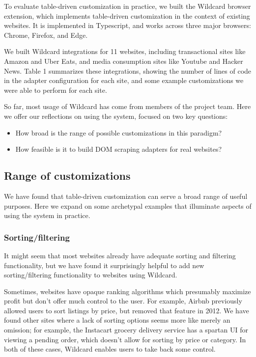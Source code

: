 \documentclass[sigplan,screen,10pt,anonymous,review]{acmart}
\providecommand{\tightlist}{%
  \setlength{\itemsep}{0pt}\setlength{\parskip}{0pt}}
\begin{document}
To evaluate table-driven customization in practice, we built the
Wildcard browser extension, which implements table-driven customization
in the context of existing websites. It is implemented in Typescript,
and works across three major browsers: Chrome, Firefox, and Edge.

We built Wildcard integrations for 11 websites, including transactional
sites like Amazon and Uber Eats, and media consumption sites like
Youtube and Hacker News. Table 1 summarizes these integrations, showing
the number of lines of code in the adapter configuration for each site,
and some example customizations we were able to perform for each site.

So far, most usage of Wildcard has come from members of the project
team. Here we offer our reflections on using the system, focused on two
key questions:

\begin{itemize}
\tightlist
\item
  How broad is the range of possible customizations in this paradigm?
\item
  How feasible is it to build DOM scraping adapters for real websites?
\end{itemize}

\hypertarget{range-of-customizations}{%
\subsection{Range of customizations}\label{range-of-customizations}}

We have found that table-driven customization can serve a broad range of
useful purposes. Here we expand on some archetypal examples that
illuminate aspects of using the system in practice.

\hypertarget{sortingfiltering}{%
\subsubsection{Sorting/filtering}\label{sortingfiltering}}

It might seem that most websites already have adequate sorting and
filtering functionality, but we have found it surprisingly helpful to
add new sorting/filtering functionality to websites using Wildcard.

Sometimes, websites have opaque ranking algorithms which presumably
maximize profit but don't offer much control to the user. For example,
Airbnb previously allowed users to sort listings by price, but removed
that feature in 2012. We have found other sites where a lack of sorting
options seems more like merely an omission; for example, the Instacart
grocery delivery service has a spartan UI for viewing a pending order,
which doesn't allow for sorting by price or category. In both of these
cases, Wildcard enables users to take back some control.
\end{document}
